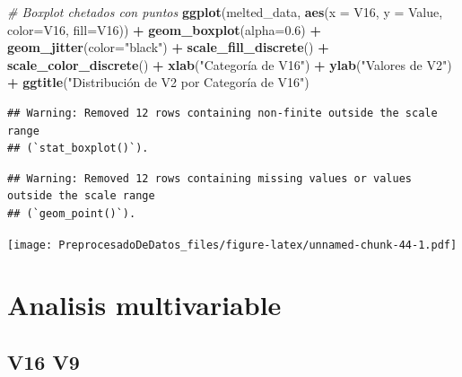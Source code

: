 \documentclass[
]{article}
\newenvironment{Shaded}{\begin{snugshade}}{\end{snugshade}}
\newcommand{\AttributeTok}[1]{\textcolor[rgb]{0.13,0.29,0.53}{#1}}
\newcommand{\CommentTok}[1]{\textcolor[rgb]{0.56,0.35,0.01}{\textit{#1}}}
\newcommand{\FloatTok}[1]{\textcolor[rgb]{0.00,0.00,0.81}{#1}}
\newcommand{\FunctionTok}[1]{\textcolor[rgb]{0.13,0.29,0.53}{\textbf{#1}}}
\newcommand{\NormalTok}[1]{#1}
\newcommand{\SpecialCharTok}[1]{\textcolor[rgb]{0.81,0.36,0.00}{\textbf{#1}}}
\newcommand{\StringTok}[1]{\textcolor[rgb]{0.31,0.60,0.02}{#1}}
\begin{document}
\begin{Shaded}
\begin{Highlighting}[]
\CommentTok{\# Boxplot chetados con puntos}
\FunctionTok{ggplot}\NormalTok{(melted\_data, }\FunctionTok{aes}\NormalTok{(}\AttributeTok{x =}\NormalTok{ V16, }\AttributeTok{y =}\NormalTok{ Value, }\AttributeTok{color=}\NormalTok{V16, }\AttributeTok{fill=}\NormalTok{V16)) }\SpecialCharTok{+}
  \FunctionTok{geom\_boxplot}\NormalTok{(}\AttributeTok{alpha=}\FloatTok{0.6}\NormalTok{) }\SpecialCharTok{+}
  \FunctionTok{geom\_jitter}\NormalTok{(}\AttributeTok{color=}\StringTok{"black"}\NormalTok{) }\SpecialCharTok{+}
  \FunctionTok{scale\_fill\_discrete}\NormalTok{() }\SpecialCharTok{+}
  \FunctionTok{scale\_color\_discrete}\NormalTok{() }\SpecialCharTok{+}
  \FunctionTok{xlab}\NormalTok{(}\StringTok{"Categoría de V16"}\NormalTok{) }\SpecialCharTok{+}
  \FunctionTok{ylab}\NormalTok{(}\StringTok{"Valores de V2"}\NormalTok{) }\SpecialCharTok{+}
  \FunctionTok{ggtitle}\NormalTok{(}\StringTok{"Distribución de V2 por Categoría de V16"}\NormalTok{)}
\end{Highlighting}
\end{Shaded}

\begin{verbatim}
## Warning: Removed 12 rows containing non-finite outside the scale range
## (`stat_boxplot()`).
\end{verbatim}

\begin{verbatim}
## Warning: Removed 12 rows containing missing values or values outside the scale range
## (`geom_point()`).
\end{verbatim}

\texttt{[image: PreprocesadoDeDatos\_files/figure-latex/unnamed-chunk-44-1.pdf]}

\hypertarget{analisis-multivariable}{%
\section{Analisis multivariable}\label{analisis-multivariable}}

\hypertarget{v16-v9}{%
\subsection{V16 V9}\label{v16-v9}}
\end{document}
